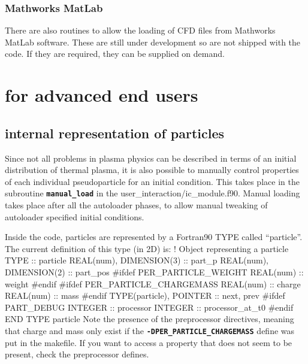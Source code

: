 \documentclass[12pt,a4paper]{article}
\newcommand{\inlinecode}[1]{{\color{warwickred} \bf\texttt{#1}}}
\newcommand{\EPOCH}{{\color{warwickdark}\fontfamily{phv}\selectfont{EPOCH}}}
\newenvironment{boxverbatim}{\lboxverbatim{none}}{\endlboxverbatim}
\begin{document}
\subsubsection{Mathworks MatLab}
There are also routines to allow the loading of CFD files from Mathworks
MatLab software. These are still under development so are not shipped with the
code. If they are required, they can be supplied on demand.

\section{{\EPOCH} for advanced end users}

\subsection{{\EPOCH} internal representation of particles}
Since not all problems in plasma physics can be described in terms of an
initial distribution of thermal plasma, it is also possible to manually
control properties of each individual pseudoparticle for an initial
condition. This takes place in the subroutine \inlinecode{manual\_load} in the
user\_interaction/ic\_module.f90. Manual loading takes place after
all the autoloader phases, to allow manual tweaking of autoloader specified
initial conditions.

Inside the code, particles are represented by a Fortran90 TYPE called
``particle''. The current definition of this type (in 2D) is:
\begin{boxverbatim}
! Object representing a particle
  TYPE :: particle
    REAL(num), DIMENSION(3) :: part_p
    REAL(num), DIMENSION(2) :: part_pos
#ifdef PER_PARTICLE_WEIGHT
    REAL(num) :: weight
#endif
#ifdef PER_PARTICLE_CHARGEMASS
    REAL(num) :: charge
    REAL(num) :: mass
#endif
    TYPE(particle), POINTER :: next, prev
#ifdef PART_DEBUG
    INTEGER :: processor
    INTEGER :: processor_at_t0
#endif
  END TYPE particle
\end{boxverbatim}
Note the presence of the preprocessor directives, meaning that charge and mass
only exist if the \inlinecode{-DPER\_PARTICLE\_CHARGEMASS} define was put in
the makefile. If you want to access a property that does not seem to be
present, check the preprocessor defines.
\end{document}
